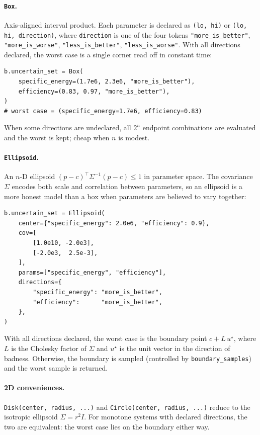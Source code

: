 \documentclass[11pt,a4paper]{article}
\begin{document}
\paragraph{\texttt{Box}.} Axis-aligned interval product. Each
parameter is declared as \texttt{(lo, hi)} or \texttt{(lo, hi, direction)},
where \texttt{direction} is one of the four tokens
\texttt{"more\_is\_better"}, \texttt{"more\_is\_worse"},
\texttt{"less\_is\_better"}, \texttt{"less\_is\_worse"}. With all
directions declared, the worst case is a single corner read off in
constant time:
\begin{lstlisting}
b.uncertain_set = Box(
    specific_energy=(1.7e6, 2.3e6, "more_is_better"),
    efficiency=(0.83, 0.97, "more_is_better"),
)
# worst case = (specific_energy=1.7e6, efficiency=0.83)
\end{lstlisting}
When some directions are undeclared, all $2^n$ endpoint combinations
are evaluated and the worst is kept; cheap when $n$ is modest.

\paragraph{\texttt{Ellipsoid}.} An $n$-D ellipsoid
$(p - c)^\top \Sigma^{-1} (p - c) \leq 1$ in parameter space. The
covariance $\Sigma$ encodes both scale and correlation between
parameters, so an ellipsoid is a more honest model than a box when
parameters are believed to vary together:
\begin{lstlisting}
b.uncertain_set = Ellipsoid(
    center={"specific_energy": 2.0e6, "efficiency": 0.9},
    cov=[
        [1.0e10, -2.0e3],
        [-2.0e3,  2.5e-3],
    ],
    params=["specific_energy", "efficiency"],
    directions={
        "specific_energy": "more_is_better",
        "efficiency":      "more_is_better",
    },
)
\end{lstlisting}
With all directions declared, the worst case is the boundary point
$c + L\,u^\star$, where $L$ is the Cholesky factor of $\Sigma$ and
$u^\star$ is the unit vector in the direction of badness. Otherwise,
the boundary is sampled (controlled by \texttt{boundary\_samples}) and
the worst sample is returned.

\paragraph{2D conveniences.} \texttt{Disk(center, radius, ...)} and
\texttt{Circle(center, radius, ...)} reduce to the isotropic
ellipsoid $\Sigma = r^2 I$. For monotone systems with declared
directions, the two are equivalent: the worst case lies on the
boundary either way.
\end{document}
